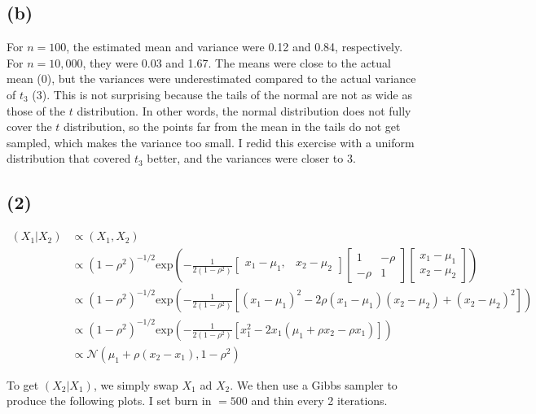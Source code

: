 \documentclass[11pt]{article}
\begin{document}
\subsection*{(b)}
For $n=100$, the estimated mean and variance were 0.12 and 0.84, respectively. For $n=10,000$, they were 0.03 and 1.67. The means were close to the actual mean (0), but the variances were underestimated compared to the actual variance of $t_3$ (3). This is not surprising because the tails of the normal are not as wide as those of the $t$ distribution. In other words, the normal distribution does not fully cover the $t$ distribution, so the points far from the mean in the tails do not get sampled, which makes the variance too small. I redid this exercise with a uniform distribution that  covered $t_3$ better, and the variances were closer to 3.

\subsection*{(2)}
\begin{align*}
    (X_1|X_2) & \propto (X_1, X_2)\\
    & \propto (1-\rho^2)^{-1/2}\text{exp} \left( -\frac{1}{2(1-\rho^2)} \begin{bmatrix} x_1-\mu_1, &x_2-\mu_2 \end{bmatrix} \begin{bmatrix} 1 & -\rho \\ -\rho & 1 \end{bmatrix}\begin{bmatrix} x_1-\mu_1 \\ x_2-\mu_2 \end{bmatrix}\right)\\
    & \propto (1-\rho^2)^{-1/2}\text{exp} \left( -\frac{1}{2(1-\rho^2)}[(x_1-\mu_1)^2-2\rho(x_1-\mu_1)(x_2-\mu_2) + (x_2-\mu_2)^2] \right)\\
     & \propto (1-\rho^2)^{-1/2}\text{exp} \left( -\frac{1}{2(1-\rho^2)}[x_1^2-2x_1(\mu_1+\rho x_2 - \rho x_1)] \right)\\
     & \propto \mathcal{N}(\mu_1 + \rho(x_2-x_1), 1-\rho^2)
\end{align*}

To get $(X_2|X_1)$, we simply swap $X_1$ ad $X_2$. We then use a Gibbs sampler to produce the following plots. I set burn in $=500$ and thin every 2 iterations.
\end{document}

